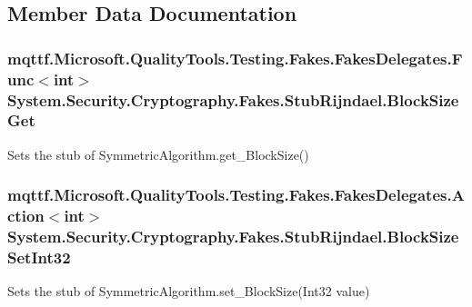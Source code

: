 \subsection{Member Data Documentation}
\hypertarget{class_system_1_1_security_1_1_cryptography_1_1_fakes_1_1_stub_rijndael_ad55fbd674231d4658d3a0399b22cb152}{
\subsubsection[{Block\-Size\-Get}]{\setlength{\rightskip}{0pt plus 5cm}mqttf.\-Microsoft.\-Quality\-Tools.\-Testing.\-Fakes.\-Fakes\-Delegates.\-Func$<$int$>$ System.\-Security.\-Cryptography.\-Fakes.\-Stub\-Rijndael.\-Block\-Size\-Get}}\label{class_system_1_1_security_1_1_cryptography_1_1_fakes_1_1_stub_rijndael_ad55fbd674231d4658d3a0399b22cb152}


Sets the stub of Symmetric\-Algorithm.\-get\-\_\-\-Block\-Size()

\hypertarget{class_system_1_1_security_1_1_cryptography_1_1_fakes_1_1_stub_rijndael_aff7db4f2f4d60580bb7ad1425260b9df}{
\subsubsection[{Block\-Size\-Set\-Int32}]{\setlength{\rightskip}{0pt plus 5cm}mqttf.\-Microsoft.\-Quality\-Tools.\-Testing.\-Fakes.\-Fakes\-Delegates.\-Action$<$int$>$ System.\-Security.\-Cryptography.\-Fakes.\-Stub\-Rijndael.\-Block\-Size\-Set\-Int32}}\label{class_system_1_1_security_1_1_cryptography_1_1_fakes_1_1_stub_rijndael_aff7db4f2f4d60580bb7ad1425260b9df}


Sets the stub of Symmetric\-Algorithm.\-set\-\_\-\-Block\-Size(\-Int32 value)

